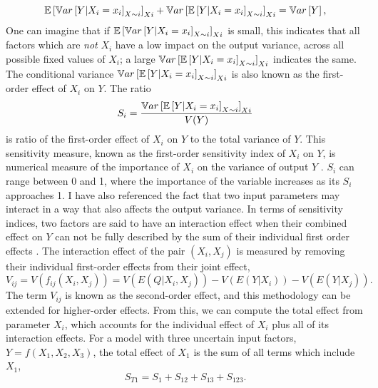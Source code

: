 \begin{equation}
    \mathbb{E}\left[\mathbb{V}ar\left[Y|X_i=x_i\right]_{X\sim i}\right]_{Xi} + \mathbb{V}ar\left[\mathbb{E}\left[Y|X_i=x_i\right]_{X\sim i}\right]_{Xi} = \mathbb{V}ar\left[Y\right],
\end{equation}
One can imagine that if $\mathbb{E}\left[\mathbb{V}ar\left[Y|X_i=x_i\right]_{X\sim i}\right]_{Xi}$ is small, this indicates that all factors which are \textit{not} $X_i$ have a low impact on the output variance, across all possible fixed values of $X_i$; a large $\mathbb{V}ar\left[\mathbb{E}\left[Y|X_i=x_i\right]_{X\sim i}\right]_{Xi}$ indicates the same. The conditional variance $\mathbb{V}ar\left[\mathbb{E}\left[Y|X_i=x_i\right]_{X\sim i}\right]_{Xi}$ is also known as the first-order effect of $X_i$ on $Y$. The ratio 
\begin{equation}\label{eq:first-order-si}
    S_i = \frac{\mathbb{V}ar\left[\mathbb{E}\left[Y|X_i=x_i\right]_{X\sim i}\right]_{Xi}}{V(Y)}
\end{equation}
is ratio of the first-order effect of $X_i$ on $Y$ to the total variance of $Y$. This sensitivity measure, known as the first-order sensitivity index of $X_i$ on $Y$, is numerical measure of the importance of $X_i$ on the variance of output $Y$ \cite{saltelliGSA}.  $S_i$ can range between 0 and 1, where the importance of the variable increases as its $S_i$ approaches 1.
I have also referenced the fact that two input parameters may interact in a way that also affects the output variance. In terms of sensitivity indices, two factors are said to have an interaction effect when their combined effect on $Y$ can not be fully described by the sum of their individual first order effects \cite{saltelliGSA}. The interaction effect of the pair $(X_i,X_j)$ is measured by removing their individual first-order effects from their joint effect,
\begin{equation}\label{eq:interaction-effect}
    V_{ij} = V(f_{ij}(X_i,X_j)) = V(E(Q|X_i,X_j)) - V(E(Y|X_i)) - V(E(Y|X_j)).
\end{equation}
The term $V_{ij}$ is known as the second-order effect, and this methodology can be extended for higher-order effects. From this, we can compute the total effect from parameter $X_i$, which accounts for the individual effect of $X_i$ plus all of its interaction effects. For a model with three uncertain input factors, $Y = f(X_1,X_2,X_3)$, the total effect of $X_1$ is the sum of all terms which include $X_1$,
\begin{equation}\label{eq:total-effect-si}
    S_{T1} = S_1 + S_{12} + S_{13} + S_{123} .
\end{equation}

